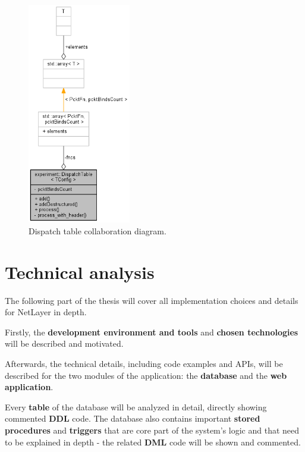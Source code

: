 \documentclass[12pt]{report}
\newcommand{\+}{\discretionary{\mbox{\scriptsize$\hookleftarrow$}}{}{}}
\renewcommand\emph{\textbf}
\begin{document}
                \begin{figure}[H]
                \caption{Dispatch table collaboration diagram.}
                \centering
                \includegraphics[width=0.4\textwidth]{d/coll/coll_disptab.png}
                \end{figure}

                \newpage                




\part{Technical analysis}
        The following part of the thesis will cover all implementation choices and details for NetLayer in depth.

        Firstly, the \emph{development environment and tools} and \emph{chosen technologies} will be described and motivated.

        Afterwards, the technical details, including code examples and APIs, will be described for the two modules of the application: the \emph{database} and the \emph{web application}.

        Every \emph{table} of the database will be analyzed in detail, directly showing commented \emph{DDL} code. The database also contains important \emph{stored procedures} and \emph{triggers} that are core part of the system's logic and that need to be explained in depth - the related \emph{DML} code will be shown and commented.
\end{document}
